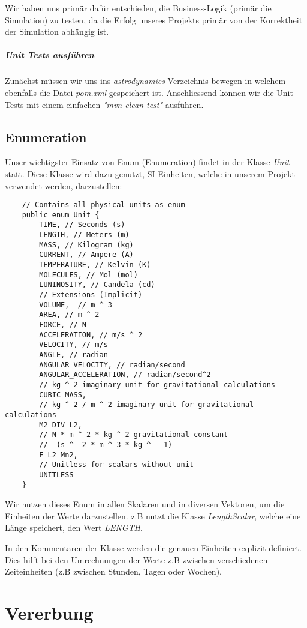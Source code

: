 Wir haben uns primär dafür entschieden, die Business-Logik (primär die Simulation) zu testen, da die Erfolg unseres Projekts primär von der Korrektheit der Simulation abhängig ist.

\subparagraph{Unit Tests ausführen}

Zunächst müssen wir uns ins \textit{astrodynamics} Verzeichnis bewegen in welchem ebenfalls die Datei \textit{pom.xml} gespeichert ist.
Anschliessend können wir die Unit-Tests mit einem einfachen \textit{"mvn clean test"} ausführen.

\subsection{Enumeration}

Unser wichtigster Einsatz von Enum (Enumeration) findet in der Klasse \textit{Unit} statt. Diese Klasse wird dazu genutzt, SI Einheiten, welche in unserem Projekt verwendet werden, darzustellen:

\begin{lstlisting}
	// Contains all physical units as enum
	public enum Unit {
		TIME, // Seconds (s)
		LENGTH, // Meters (m)
		MASS, // Kilogram (kg)
		CURRENT, // Ampere (A)
		TEMPERATURE, // Kelvin (K)
		MOLECULES, // Mol (mol)
		LUNINOSITY, // Candela (cd)
		// Extensions (Implicit)
		VOLUME,  // m ^ 3
		AREA, // m ^ 2
		FORCE, // N
		ACCELERATION, // m/s ^ 2
		VELOCITY, // m/s
		ANGLE, // radian
		ANGULAR_VELOCITY, // radian/second
		ANGULAR_ACCELERATION, // radian/second^2
		// kg ^ 2 imaginary unit for gravitational calculations
		CUBIC_MASS, 
		// kg ^ 2 / m ^ 2 imaginary unit for gravitational calculations
		M2_DIV_L2,
		// N * m ^ 2 * kg ^ 2 gravitational constant
		//  (s ^ -2 * m ^ 3 * kg ^ - 1) 
		F_L2_Mn2,
		// Unitless for scalars without unit
		UNITLESS
	}
\end{lstlisting}

Wir nutzen dieses Enum in allen Skalaren und in diversen Vektoren, um die Einheiten der Werte darzustellen. z.B nutzt die Klasse \textit{LengthScalar}, welche eine Länge speichert, den Wert \textit{LENGTH}.

In den Kommentaren der Klasse werden die genauen Einheiten explizit definiert. Dies hilft bei den Umrechnungen der Werte z.B zwischen verschiedenen Zeiteinheiten (z.B zwischen Stunden, Tagen oder Wochen).

\section{Vererbung}

